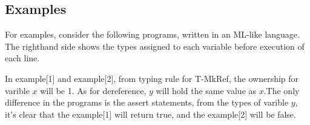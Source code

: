 \documentclass[runningheads]{llncs}
\begin{document}
\subsection{Examples}
For examples, consider the following programs, written in an ML-like language.
The righthand side shows the types assigned to each variable before execution of
each line.
\begin{parcolumns}{2}
\colplacechunks
\end{parcolumns}

\begin{parcolumns}{2}
\colplacechunks
\end{parcolumns}

In example[1] and example[2], from typing rule for T-MkRef, the ownership for varible $x$ will be 1.
As for dereference, $y$ will hold the same value as $x$.The only difference in the programs is the
assert statements, from the types of varible $y$, it's clear that the example[1] will return true,
and the example[2] will be false.

\begin{parcolumns}{2}
\colplacechunks
\end{parcolumns}
\end{document}
